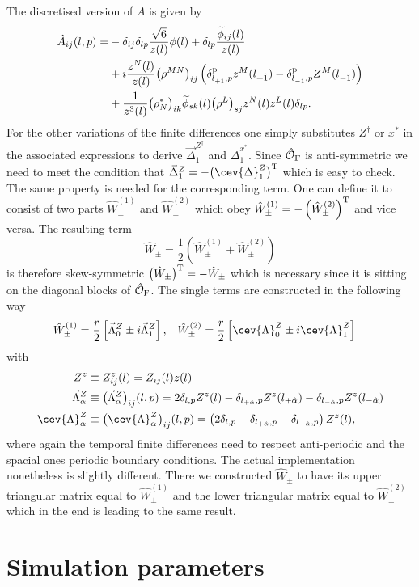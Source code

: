 %
%
The discretised version of $A$ is given by
%
%
\begin{align}
\hat{A}_{ij}(l,p) = &-\delta_{ij}\delta_{lp}\frac{\sqrt{6}}{z(l)}\phi(l) + \delta_{lp}\frac{\widetilde{\phi}_{ij}(l)}{z(l)} \notag \\
%
&+i \frac{z^{N}(l)}{z(l)} \big(\rho^{MN}\big)_{ij} \left( \delta^{\rm p}_{l_{+\hat{1}},p} z^{M}(l_{+\hat{1}}) - \delta^{\rm p}_{l_{-\hat{1}},p} Z^{M}(l_{-\hat{1}})\right) \\
%
&+ \frac{1}{z^{3}(l)} \big(\rho^{*}_{N}\big)_{ik} \widetilde{\phi}_{sk}(l) \big(\rho^{L}\big)_{sj} z^{N}(l)z^{L}(l) \delta_{lp}. \notag
\end{align}
%
%
For the other variations of the finite differences one simply substitutes $Z^{\dagger}$ or $x^{*}$ in the associated expressions to derive $\vec{\Delta}^{Z^{\dagger}}_{1}$ and $\bar{\Delta}^{x^{*}}_{1}$. Since $\hat{\mathcal{O}}_{\rm F}$ is anti-symmetric we need to meet the condition that $\vec{\Delta}^{Z}_{1}=-\big( \cev{\Delta}^{Z}_{1} \big)^{\rm T}$ which is easy to check. The same property is needed for the corresponding  term. One can define it to consist of two parts $\hat{W}^{(1)}_{\pm}$ and $\hat{W}^{(2)}_{\pm}$ which obey $\hat{W}^{(1)}_{\pm} = -\left( \hat{W}^{(2)}_{\pm} \right)^{\rm T}$ and vice versa. The resulting  term
%
%
\begin{equation}
\hat{W}_{\pm} = \frac{1}{2}\left( \hat{W}^{(1)}_{\pm} + \hat{W}^{(2)}_{\pm} \right)
\end{equation}
%
%
is therefore skew-symmetric $\big(\hat{W}_{\pm}\big)^{\rm T} = -\hat{W}_{\pm}$ which is necessary since it is sitting on the diagonal blocks of $\hat{\mathcal{O}}_{\rm F}$. The single terms are constructed in the following way
%
%
\begin{align}
\hat{W}^{(1)}_{\pm} &= \frac{r}{2} \left[ \vec{\Lambda}^{Z}_{0} \pm i \vec{\Lambda}^{Z}_{1}\right] , &
\hat{W}^{(2)}_{\pm} &= \frac{r}{2} \left[ \cev{\Lambda}^{Z}_{0} \pm i \cev{\Lambda}^{Z}_{1}\right]
\end{align}
%
%
with
%
%
\begin{align}
Z^{z} &\equiv Z^{z}_{ij}(l) = Z_{ij}(l)z(l) \notag \\
\vec{\Lambda}^{Z}_{\alpha} &\equiv \big(\vec{\Lambda}^{Z}_{\alpha}\big)_{ij}(l,p) = 2\delta_{l,p}Z^{z}(l) - \delta_{l_{+\hat{\alpha}},p}Z^{z}(l_{+\hat{\alpha}}) - \delta_{l_{-\hat{\alpha}},p}Z^{z}(l_{-\hat{\alpha}}) \\
%
%
\cev{\Lambda}^{Z}_{\alpha} &\equiv \big(\cev{\Lambda}^{Z}_{\alpha}\big)_{ij}(l,p) = \left( 2 \delta_{l,p} -\delta_{l_{+\hat{\alpha}},p} - \delta_{l_{-\hat{\alpha}},p} \right) Z^{z}(l), \notag
\end{align}
%
%
where again the temporal finite differences need to respect anti-periodic and the spacial ones periodic boundary conditions. The actual implementation nonetheless is slightly different. There we constructed $\hat{W}_{\pm}$ to have its upper triangular matrix equal to $\hat{W}_{\pm}^{(1)}$ and the lower triangular matrix equal to $\hat{W}_{\pm}^{(2)}$ which in the end is leading to the same result.
%
%
%
\chapter{Simulation parameters}

